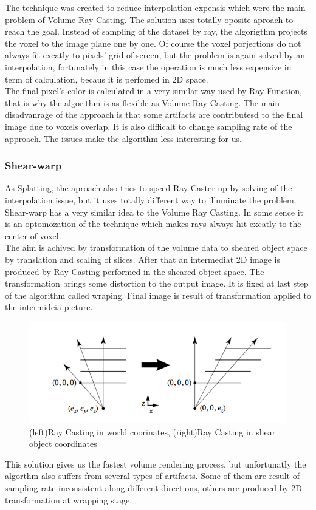 \documentclass[twoside, english, 11pt]{report}
\begin{document}
The technique was created to reduce interpolation expensis which were the main problem of Volume Ray Casting. The solution uses totally oposite aproach to reach the goal. Instead of sampling of the dataset by ray, the algorigthm projects the voxel to the image plane one by one. Of course the voxel porjections do not always fit excatly to pixels' grid of screen, but the problem is again solved by an interpolation, fortunately in this case the operation is much less expensive in term of calculation, becaus it is perfomed in 2D space. \\

The final pixel's color is calculated in a very similar way used by Ray Function, that is why the algorithm is as flexible as Volume Ray Casting. The main disadvanrage of the approach is that some artifacts are contributesd to the final image due to voxels overlap. It is also difficalt to change sampling rate of the approach. The issues make the algorithm less interesting for us.

\subsubsection{Shear-warp}

As Splatting, the aproach also tries to speed Ray Caster up by solving of the interpolation issue, but it uses totally different way to illuminate the problem. Shear-warp has a very similar idea to the Volume Ray Casting. In some sence it is an optomozation of the technique which makes rays always hit excatly to the center of voxel.\\

The aim is achived by transformation of the volume data to sheared object space by translation and scaling of slices. After that an intermediat 2D image is produced by Ray Casting performed in the sheared object space. The transformation brings some distortion to the output image. It is fixed at last step of the algorithm called wraping. Final image is result of transformation applied to the intermideia picture.\\
\begin{figure}[H]
\centerline{\includegraphics[scale=0.5]{img/shear-warp}}
\caption{(left)Ray Casting in world coorinates, (right)Ray Casting in shear object coordinates}
\end{figure}
This solution gives us the fastest volume rendering process, but unfortunatly the algorthm also suffers from several types of artifacts. Some of them are result of sampling rate inconsistent along different directions, others are produced by 2D transformation at wrapping stage.
\end{document}
